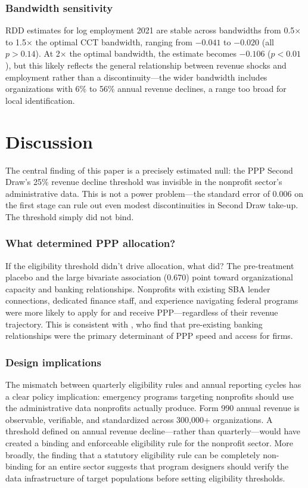 \documentclass[12pt]{article}
\begin{document}
\subsubsection*{Bandwidth sensitivity} RDD estimates for log employment 2021 are stable across bandwidths from 0.5$\times$ to 1.5$\times$ the optimal CCT bandwidth, ranging from $-0.041$ to $-0.020$ (all $p > 0.14$). At 2$\times$ the optimal bandwidth, the estimate becomes $-0.106$ ($p < 0.01$), but this likely reflects the general relationship between revenue shocks and employment rather than a discontinuity---the wider bandwidth includes organizations with 6\% to 56\% annual revenue declines, a range too broad for local identification.


\section{Discussion}

The central finding of this paper is a precisely estimated null: the PPP Second Draw's 25\% revenue decline threshold was invisible in the nonprofit sector's administrative data. This is not a power problem---the standard error of 0.006 on the first stage can rule out even modest discontinuities in Second Draw take-up. The threshold simply did not bind.

\subsubsection*{What determined PPP allocation?} If the eligibility threshold didn't drive allocation, what did? The pre-treatment placebo and the large bivariate association (0.670) point toward organizational capacity and banking relationships. Nonprofits with existing SBA lender connections, dedicated finance staff, and experience navigating federal programs were more likely to apply for and receive PPP---regardless of their revenue trajectory. This is consistent with \citet{bartik2020}, who find that pre-existing banking relationships were the primary determinant of PPP speed and access for firms.

\subsubsection*{Design implications} The mismatch between quarterly eligibility rules and annual reporting cycles has a clear policy implication: emergency programs targeting nonprofits should use the administrative data nonprofits actually produce. Form 990 annual revenue is observable, verifiable, and standardized across 300,000+ organizations. A threshold defined on annual revenue decline---rather than quarterly---would have created a binding and enforceable eligibility rule for the nonprofit sector. More broadly, the finding that a statutory eligibility rule can be completely non-binding for an entire sector suggests that program designers should verify the data infrastructure of target populations before setting eligibility thresholds.
\end{document}
